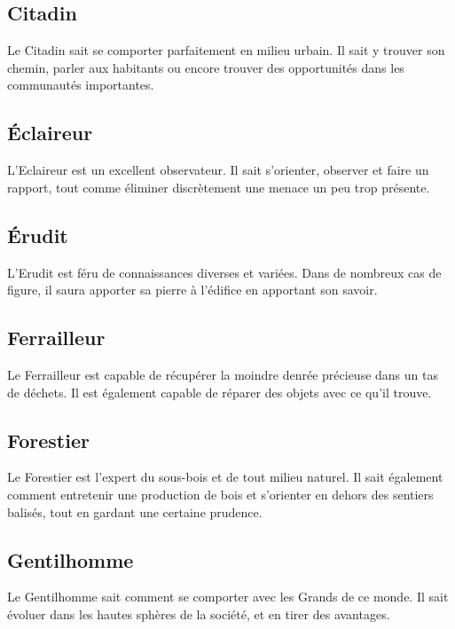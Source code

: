 \subsection*{Citadin}

Le Citadin sait se comporter parfaitement en milieu urbain. Il sait y trouver son chemin, parler aux habitants ou encore trouver des opportunités dans les communautés importantes.

\subsection*{Éclaireur}

L'Eclaireur est un excellent observateur. Il sait s'orienter, observer et faire un rapport, tout comme éliminer discrètement une menace un peu trop présente.

\subsection*{Érudit}

L'Erudit est féru de connaissances diverses et variées. Dans de nombreux cas de figure, il saura apporter sa pierre à l'édifice en apportant son savoir.

\subsection*{Ferrailleur}

Le Ferrailleur est capable de récupérer la moindre denrée précieuse dans un tas de déchets. Il est également capable de réparer des objets avec ce qu'il trouve.

\subsection*{Forestier}

Le Forestier est l'expert du sous-bois et de tout milieu naturel. Il sait également comment entretenir une production de bois et s'orienter en dehors des sentiers balisés, tout en gardant une certaine prudence.

\subsection*{Gentilhomme}

Le Gentilhomme sait comment se comporter avec les Grands de ce monde. Il sait évoluer dans les hautes sphères de la société, et en tirer des avantages.

